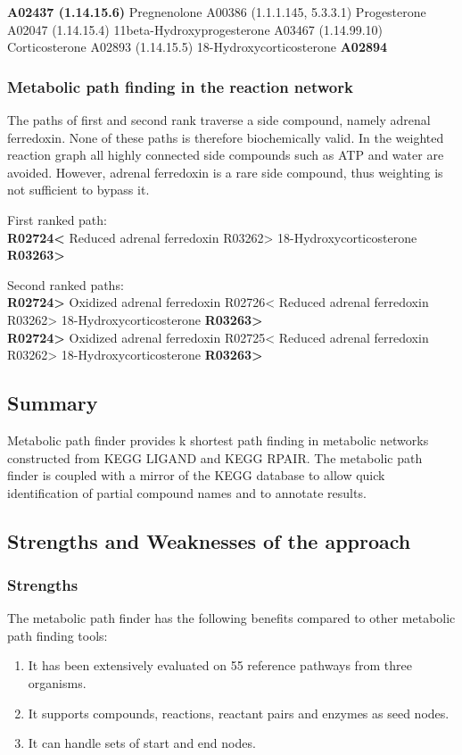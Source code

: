 \textbf{A02437 (1.14.15.6)} Pregnenolone A00386 (1.1.1.145, 5.3.3.1) Progesterone A02047 (1.14.15.4) 11beta-Hydroxyprogesterone A03467 (1.14.99.10) Corticosterone A02893 (1.14.15.5) 18-Hydroxycorticosterone \textbf{A02894}

\subsubsection{Metabolic path finding in the reaction network}

The paths of first and second rank traverse a side compound, namely adrenal ferredoxin. None of these paths is therefore biochemically valid.
In the weighted reaction graph all highly connected side compounds such as ATP and water are avoided. However, adrenal ferredoxin
is a rare side compound, thus weighting is not sufficient to bypass it.

First ranked path:\\
\textbf{R02724<} Reduced adrenal ferredoxin R03262> 18-Hydroxycorticosterone \textbf{R03263>}

Second ranked paths:\\

\textbf{R02724>} Oxidized adrenal ferredoxin R02726< Reduced adrenal ferredoxin R03262> 18-Hydroxycorticosterone \textbf{R03263>}\\

\textbf{R02724>} Oxidized adrenal ferredoxin R02725< Reduced adrenal ferredoxin R03262> 18-Hydroxycorticosterone \textbf{R03263>}

\subsection{Summary}

Metabolic path finder provides k shortest path finding in metabolic networks constructed from KEGG LIGAND and KEGG RPAIR.
The metabolic path finder is coupled with a mirror of the KEGG database to allow quick identification of partial compound
names and to annotate results.

\subsection{Strengths and Weaknesses of the approach}

\subsubsection{Strengths}
The metabolic path finder has the following benefits compared to other metabolic path finding tools:
\begin{enumerate}

\item It has been extensively evaluated on 55 reference pathways from three organisms.

\item It supports compounds, reactions, reactant pairs and enzymes as seed nodes.

\item It can handle sets of start and end nodes.

\end{enumerate}

